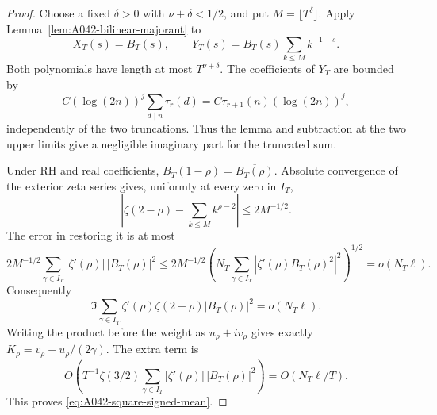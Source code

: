 \begin{proof}
Choose a fixed \(\delta>0\) with \(\nu+\delta<1/2\), and put
\(M=\lfloor T^\delta\rfloor\).  Apply
Lemma~\ref{lem:A042-bilinear-majorant} to
\[
 X_T(s)=B_T(s),\qquad
 Y_T(s)=B_T(s)\sum_{k\le M}k^{-1-s}.
\]
Both polynomials have length at most \(T^{\nu+\delta}\).
The coefficients of \(Y_T\) are bounded by
\[
 C(\log(2n))^j\sum_{d\mid n}\tau_r(d)
            =C\tau_{r+1}(n)(\log(2n))^j,
\]
independently of the two truncations.  Thus the lemma and
subtraction at the two upper limits give a negligible
imaginary part for the truncated sum.

Under RH and real coefficients,
\(B_T(1-\rho)=\overline{B_T(\rho)}\).
Absolute convergence of the exterior zeta series gives,
uniformly at every zero in \(I_T\),
\[
 \left|\zeta(2-\rho)
                   -\sum_{k\le M}k^{\rho-2}\right|
                                  \le2M^{-1/2}.
\]
The error in restoring it is at most
\[
 2M^{-1/2}\sum_{\gamma\in I_T}
                        |\zeta'(\rho)|\,|B_T(\rho)|^2
 \le2M^{-1/2}
       \left(N_T\sum_{\gamma\in I_T}
                  |\zeta'(\rho)B_T(\rho)^2|^2\right)^{1/2}
                         =o(N_T\ell).
\]
Consequently
\[
 \Im\sum_{\gamma\in I_T}
       \zeta'(\rho)\zeta(2-\rho)|B_T(\rho)|^2
                                         =o(N_T\ell).
\]
Writing the product before the weight as \(u_\rho+i v_\rho\)
gives exactly \(K_\rho=v_\rho+u_\rho/(2\gamma)\).
The extra term is
\[
 O\left(T^{-1}\zeta(3/2)
          \sum_{\gamma\in I_T}
                       |\zeta'(\rho)|\,|B_T(\rho)|^2\right)
                           =O(N_T\ell/T).
\]
This proves \eqref{eq:A042-square-signed-mean}.


\end{proof}
